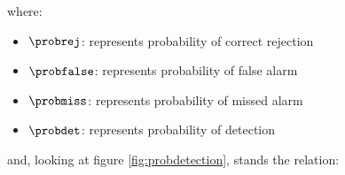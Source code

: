 where:
\begin{itemize}
\item $\probrej$: represents probability of correct rejection
\item $\probfalse$: represents probability of false alarm
\item $\probmiss$: represents probability of missed alarm
\item $\probdet$: represents probability of detection
\end{itemize}
and, looking at figure \ref{fig:probdetection}, stands the relation:

